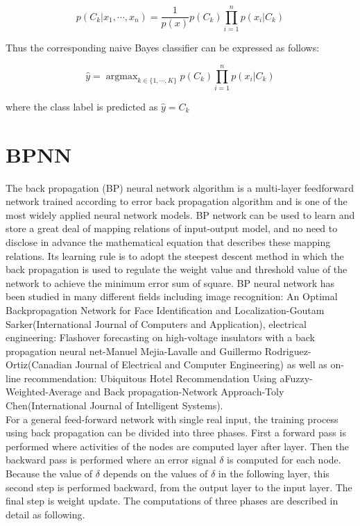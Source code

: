 \documentclass{kththesis}
\begin{document}
\begin{equation}
p(C_{k}|x_{1},\cdots,x_{n})=\frac{1}{p(x)}p(C_{k})\prod^{n}_{i=1}p(x_{i}|C_{k})
\end{equation}

Thus the corresponding naive Bayes classifier can be expressed as follows:

\begin{equation}
\hat{y}=\mathop{\arg\max}_{k\in \{1,\cdots,K\}} p(C_{k})\prod^{n}_{i=1}p(x_{i}|C_{k})
\end{equation}

where the class label is predicted as $\hat{y}=C_{k}$

\section{BPNN}
The back propagation (BP) neural network algorithm is a multi-layer feedforward network trained according to error back propagation algorithm and is one of the most widely applied neural network models. BP network can be used to learn and store a great deal of mapping relations of input-output model, and no need to disclose in advance the mathematical equation that describes these mapping relations. Its learning rule is to adopt the steepest descent method in which the back propagation is used to regulate the weight value and threshold value of the network to achieve the minimum error sum of square. BP neural network has been studied in many different fields including image recognition: An Optimal Backpropagation Network for Face Identification and Localization-Goutam Sarker(International Journal of Computers and Application), electrical engineering: Flashover forecasting on high-voltage insulators with a back propagation neural net-Manuel Mejia-Lavalle and Guillermo Rodriguez-Ortiz(Canadian Journal of Electrical and Computer Engineering) as well as on-line recommendation: Ubiquitous Hotel Recommendation Using aFuzzy-Weighted-Average and Back propagation-Network Approach-Toly Chen(International Journal of Intelligent Systems).\\

For a general feed-forward network with single real input, the training process using back propagation can be divided into three phases. First a forward pass is performed where activities of the nodes are computed layer after layer. Then the backward pass is performed where an error signal $\delta$ is computed for each node. Because the value of $\delta$ depends on the values of $\delta$ in the following layer, this second step is performed backward, from the output layer to the input layer. The final step is weight update. The computations of three phases are described in detail as following.\\
\end{document}
